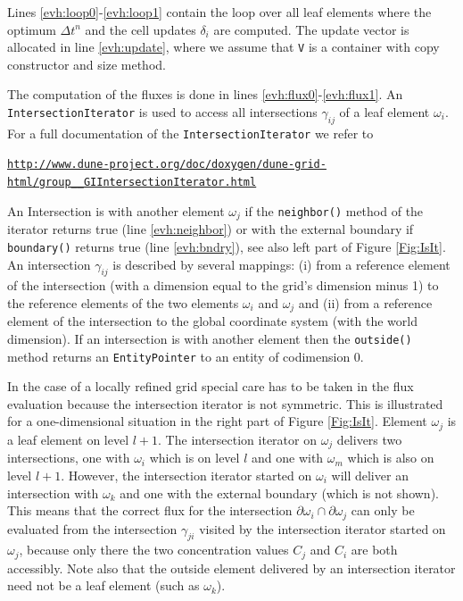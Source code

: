 \documentclass[11pt,a4paper,headinclude,footinclude,DIV16,normalheadings]{scrreprt}
\begin{document}
Lines \ref{evh:loop0}-\ref{evh:loop1} contain the loop over all leaf
elements where the optimum $\Delta t^n$ and the cell updates
$\delta_i$ are computed. The update vector is allocated in line
\ref{evh:update}, where we assume that \lstinline!V! is a container
with copy constructor and size method.

The computation of the fluxes is done in lines
\ref{evh:flux0}-\ref{evh:flux1}. An \lstinline!IntersectionIterator!
is used to access all intersections $\gamma_{ij}$ of a leaf element
$\omega_i$. For a full documentation of the
\lstinline!IntersectionIterator! we refer to
\begin{center}
\href{http://www.dune-project.org/doc/doxygen/dune-grid-html/group\_\_GIIntersectionIterator.html}
{{\small\texttt{http://www.dune-project.org/doc/doxygen/dune-grid-html/group\_\_GIIntersectionIterator.html}}}
\end{center}
An Intersection is with another element $\omega_j$ if the
\lstinline!neighbor()! method of the iterator returns true (line
\ref{evh:neighbor}) or with the external boundary if
\lstinline!boundary()! returns true (line \ref{evh:bndry}), see also
left part of Figure \ref{Fig:IsIt}. An intersection $\gamma_{ij}$ is
described by several mappings: (i) from a reference element of the
intersection (with a dimension equal to the grid's dimension minus 1)
to the reference elements of the two elements $\omega_i$ and
$\omega_j$ and (ii) from a reference element of the intersection to
the global coordinate system (with the world dimension). If an
intersection is with another element then the \lstinline!outside()!
method returns an \lstinline!EntityPointer! to an entity of
codimension 0.

In the case of a locally refined grid special care has to be taken in
the flux evaluation because the intersection iterator is not
symmetric. This is illustrated for a one-dimensional situation in
the right part of Figure \ref{Fig:IsIt}. Element
$\omega_j$ is a leaf element on level $l+1$. The intersection iterator
on $\omega_j$ delivers two intersections, one with $\omega_i$ which is
on level $l$ and one with $\omega_m$ which is also on level
$l+1$. However, the intersection iterator started on $\omega_i$ will
deliver an intersection with $\omega_k$ and one with the external
boundary (which is not shown). This means that the correct flux for
the intersection $\partial\omega_i\cap\partial\omega_j$ can only be
evaluated from the intersection $\gamma_{ji}$ visited by the
intersection iterator started on $\omega_j$, because only there the
two concentration values $C_j$ and $C_i$ are both accessibly. Note
also that the outside element delivered by an intersection
iterator need not be a leaf element (such as $\omega_k$). 
\end{document}
